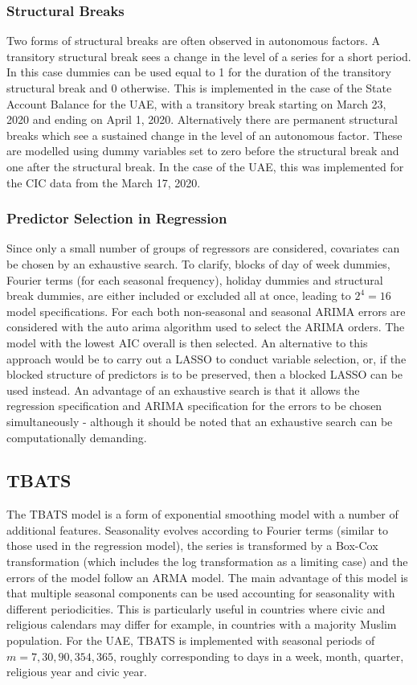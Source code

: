 \documentclass{article}
\begin{document}
\subsubsection{Structural Breaks}

Two forms of structural breaks are often observed in autonomous factors. A transitory structural break sees a change in the level of a series for a short period. In this case dummies can be used equal to 1 for the duration of the transitory structural break and 0 otherwise. This is implemented in the case of the State Account Balance for the UAE, with a transitory break starting on March 23, 2020 and ending on April 1, 2020. Alternatively there are permanent structural breaks which see a sustained change in the level of an autonomous factor. These are modelled using dummy variables set to zero before the structural break and one after the structural break. In the case of the UAE, this was implemented for the CIC data from the March 17, 2020.

\subsubsection{Predictor Selection in Regression}

Since only a small number of groups of regressors are considered, covariates can be chosen by an exhaustive search. To clarify, blocks of day of week dummies, Fourier terms (for each seasonal frequency), holiday dummies and structural break dummies, are either included or excluded all at once, leading to $2^4=16$ model specifications. For each both non-seasonal and seasonal ARIMA errors are considered with the auto arima algorithm used to select the ARIMA orders. The model with the lowest AIC overall is then selected. An alternative to this approach would be to carry out a LASSO to conduct variable selection, or, if the blocked structure of predictors is to be preserved, then a blocked LASSO can be used instead. An advantage of an exhaustive search is that it allows the regression specification and ARIMA specification for the errors to be chosen simultaneously - although it should be noted that an exhaustive search can be computationally demanding.

\subsection{TBATS}

The TBATS model \citep{DeLEtAl2011} is a form of exponential smoothing model with a number of additional features. Seasonality evolves according to Fourier terms (similar to those used in the regression model), the series is transformed by a Box-Cox transformation (which includes the log transformation as a limiting case) and the errors of the model follow an ARMA model. The main advantage of this model is that multiple seasonal components can be used accounting for seasonality with different periodicities. This is particularly useful in countries where civic and religious calendars may differ for example, in countries with a majority Muslim population. For the UAE, TBATS is implemented with seasonal periods of $m=7,30,90,354,365$, roughly corresponding to days in a week, month, quarter, religious year and civic year.
\end{document}
